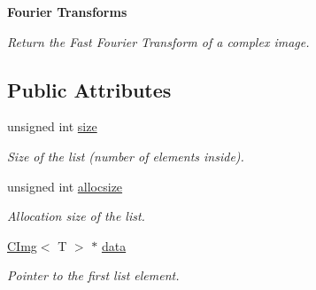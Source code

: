 \begin{Indent}{\bf Fourier Transforms}
\begin{DoxyCompactItemize}
\begin{DoxyCompactList}\small\item\em Return the Fast Fourier Transform of a complex image. \item\end{DoxyCompactList}\end{DoxyCompactItemize}
\end{Indent}
\subsection*{Public Attributes}
\begin{DoxyCompactItemize}
\item 
\hypertarget{structcimg__library_1_1_c_img_list_aa445f53f3fc891f1018c570706911a6e}{
unsigned int \hyperlink{structcimg__library_1_1_c_img_list_aa445f53f3fc891f1018c570706911a6e}{size}}
\label{structcimg__library_1_1_c_img_list_aa445f53f3fc891f1018c570706911a6e}

\begin{DoxyCompactList}\small\item\em Size of the list (number of elements inside). \item\end{DoxyCompactList}\item 
\hypertarget{structcimg__library_1_1_c_img_list_a29a33badac3960de364970bbd7294e76}{
unsigned int \hyperlink{structcimg__library_1_1_c_img_list_a29a33badac3960de364970bbd7294e76}{allocsize}}
\label{structcimg__library_1_1_c_img_list_a29a33badac3960de364970bbd7294e76}

\begin{DoxyCompactList}\small\item\em Allocation size of the list. \item\end{DoxyCompactList}\item 
\hypertarget{structcimg__library_1_1_c_img_list_a7c484b0bb0c2c5d1d42626d932f85f78}{
\hyperlink{structcimg__library_1_1_c_img}{CImg}$<$ T $>$ $\ast$ \hyperlink{structcimg__library_1_1_c_img_list_a7c484b0bb0c2c5d1d42626d932f85f78}{data}}
\label{structcimg__library_1_1_c_img_list_a7c484b0bb0c2c5d1d42626d932f85f78}

\begin{DoxyCompactList}\small\item\em Pointer to the first list element. \item\end{DoxyCompactList}\end{DoxyCompactItemize}
